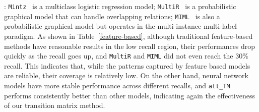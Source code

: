 
: \texttt{Mintz}~\cite{mintz2009distant} is a multiclass logistic regression model; \texttt{MultiR}~\cite{hoffmann2011knowledge} is a probabilistic graphical model that can handle overlapping relations; \texttt{MIML}~\cite{surdeanu2012multi} is also a probabilistic graphical model but operates in the multi-instance multi-label paradigm. As shown in Table~\ref{feature-based}, although traditional feature-based methods have reasonable results in the low recall region, their performances drop quickly as the recall goes up, and \texttt{MultiR} and \texttt{MIML} did not even reach the 30\% recall. This indicates that, while the patterns captured by feature based models are reliable, their coverage is relatively low. On the other hand, neural network models have more stable performance across different recalls, 
and \texttt{att\_TM} performs consistently better than other models,
indicating again the effectiveness of our transition matrix method.






